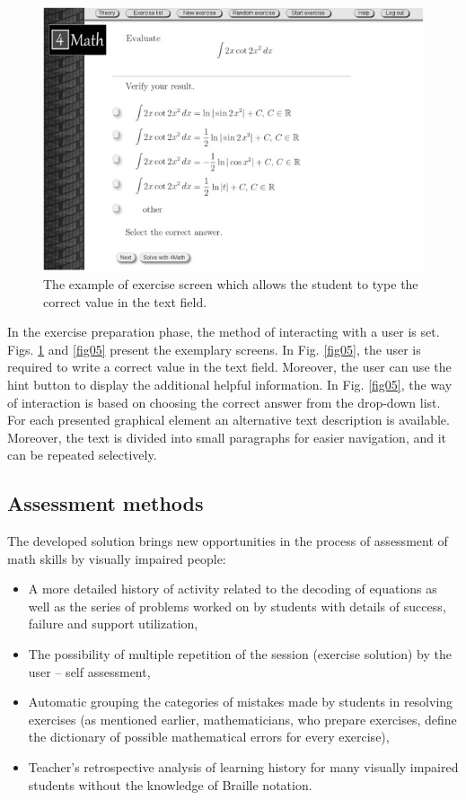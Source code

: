 \documentclass[12pt,1p]{elsarticle}
\begin{document}
\begin{figure}[t]
\centering
\includegraphics[width=5in]{./pics/4}
\caption{The example of exercise screen which allows the student to type the
correct value in the text field.}
\label{fig04}
\end{figure}

	In the exercise preparation phase, the method of interacting with a user is set. Figs. \ref{fig04} and \ref{fig05} present the exemplary screens. In Fig. \ref{fig05}, the user is required to write a correct value in the text field. Moreover, the user can use the hint button to display the additional helpful information. In Fig. \ref{fig05}, the way of interaction is based on choosing the correct answer from the drop-down list. For each presented graphical element an alternative text description is available. Moreover, the text is divided into small paragraphs for easier navigation, and it can be repeated selectively.

\subsection{Assessment methods}
	The developed solution brings new opportunities in the process of assessment of math skills by visually impaired people:

\begin{itemize}
	
	\item A more detailed history of activity related to the decoding of equations as well as the series of problems worked on by students with details of success, failure and support utilization,
    \item  The possibility of multiple repetition of the session (exercise solution) by the user – self assessment,
    \item  Automatic grouping the categories of mistakes made by students in resolving exercises (as mentioned earlier, mathematicians, who prepare exercises, define the dictionary of possible mathematical errors for every exercise),
    \item  Teacher's retrospective analysis of learning history for many visually impaired students without the knowledge of Braille notation.
\end{itemize}
	
\end{document}

